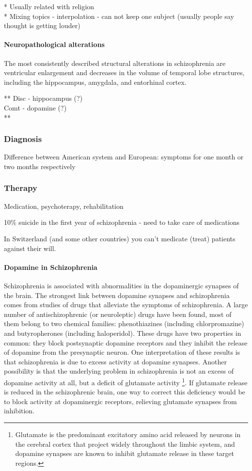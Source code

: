 \documentclass[12pt,article,oneside,a4paper]{memoir}
\begin{document}
* Usually related with religion \\
* Mixing topics - interpolation - can not keep one subject (usually people say thought is getting louder)\\

\paragraph{Neuropathological alterations}
The most consistently described structural alterations in schizophrenia are ventricular enlargement and decreases in the volume of temporal lobe structures, including the hippocampus, amygdala, and entorhinal cortex.

**
Disc - hippocampus (?)\\
Comt - dopamine (?)\\
**

\subsubsection{Diagnosis}
Difference between American system and European: symptoms for one month or two months respectively

\subsubsection{Therapy}
Medication, psychoterapy, rehabilitation

10\% suicide in the first year of schizophrenia - need to take care of medications

In Switzerland (and some other countries) you can't medicate (treat) patients against their will.


\paragraph{Dopamine in Schizophrenia}
Schizophrenia is associated with abnormalities in the dopaminergic synapses of the brain. The strongest link between dopamine synapses and schizophrenia comes from studies of drugs that alleviate the symptoms of schizophrenia.
A large number of antischizophrenic (or neuroleptic) drugs have been found, most of them belong to two chemical families: phenothiazines (including chlorpromazine) and butyropherones (including haloperidol). These drugs have two properties in common: they block postsynaptic dopamine receptors and they inhibit the release of dopamine from the presynaptic neuron. One interpretation of these results is that schizophrenia is due to excess activity at dopamine synapses. Another possibility is that the underlying problem in schizophrenia is not an excess of dopamine activity at all, but a deficit of glutamate activity \footnote{Glutamate is the predominant excitatory amino acid released by neurons in the cerebral cortex that project widely throughout the limbic system, and dopamine synapses are known to inhibit glutamate release in these target regions.}. If glutamate release is reduced in the schizophrenic brain, one way to correct this deficiency would be to block activity at dopaminergic receptors, relieving glutamate synapses from inhibition.
\end{document}
